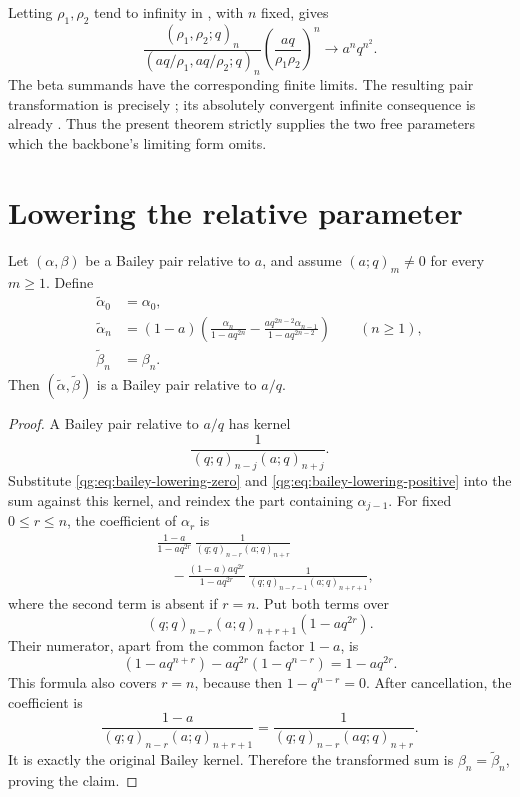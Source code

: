 \begin{remark}
\label{qg:rem:bailey-limiting-reference}
Letting \(\rho_1,\rho_2\) tend to infinity in
, with \(n\) fixed, gives
\[
 \frac{(\rho_1,\rho_2;q)_n}
      {(aq/\rho_1,aq/\rho_2;q)_n}
 \left(\frac{aq}{\rho_1\rho_2}\right)^n
 \longrightarrow a^nq^{n^2}.
\]
The beta summands have the corresponding finite limits.  The resulting pair
transformation is precisely ; its absolutely
convergent infinite consequence is already
.  Thus the present theorem strictly supplies
the two free parameters which the backbone's limiting form omits.
\end{remark}

\section{Lowering the relative parameter}
\label{qg:sec:bailey-parameter-lowering}

\begin{lemma}
\label{qg:lem-bailey-lowering}
Let \((\alpha,\beta)\) be a Bailey pair relative to \(a\), and assume
\((a;q)_m\ne0\) for every \(m\ge1\).  Define
\begin{align}
 \widetilde\alpha_0&=\alpha_0,
 \label{qg:eq:bailey-lowering-zero}\\
 \widetilde\alpha_n
 &=(1-a)\left(
 \frac{\alpha_n}{1-aq^{2n}}
 -\frac{aq^{2n-2}\alpha_{n-1}}{1-aq^{2n-2}}
 \right)
 \qquad(n\ge1),
 \label{qg:eq:bailey-lowering-positive}\\
 \widetilde\beta_n&=\beta_n.
 \label{qg:eq:bailey-lowering-beta}
\end{align}
Then \((\widetilde\alpha,\widetilde\beta)\) is a Bailey pair
relative to \(a/q\).
\end{lemma}

\begin{proof}
A Bailey pair relative to \(a/q\) has kernel
\[
  \frac{1}{(q;q)_{n-j}(a;q)_{n+j}}.
\]
Substitute \eqref{qg:eq:bailey-lowering-zero} and
\eqref{qg:eq:bailey-lowering-positive} into the sum against this
kernel, and reindex the part containing \(\alpha_{j-1}\).  For fixed
\(0\le r\le n\), the coefficient of \(\alpha_r\) is
\begin{align*}
 &\frac{1-a}{1-aq^{2r}}\,
  \frac{1}{(q;q)_{n-r}(a;q)_{n+r}}\\
 &\quad-
 \frac{(1-a)aq^{2r}}{1-aq^{2r}}\,
 \frac{1}{(q;q)_{n-r-1}(a;q)_{n+r+1}},
\end{align*}
where the second term is absent if \(r=n\).  Put both terms over
\[
 (q;q)_{n-r}(a;q)_{n+r+1}(1-aq^{2r}).
\]
Their numerator, apart from the common factor \(1-a\), is
\[
 (1-aq^{n+r})-aq^{2r}(1-q^{n-r})
 =1-aq^{2r}.
\]
This formula also covers \(r=n\), because then \(1-q^{n-r}=0\).
After cancellation, the coefficient is
\[
 \frac{1-a}{(q;q)_{n-r}(a;q)_{n+r+1}}
 =
 \frac{1}{(q;q)_{n-r}(aq;q)_{n+r}}.
\]
It is exactly the original Bailey kernel.  Therefore the transformed sum is
\(\beta_n=\widetilde\beta_n\), proving the claim.
\end{proof}

